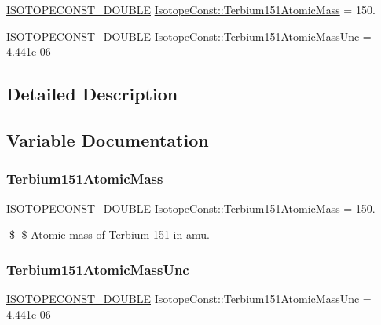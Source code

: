 \begin{DoxyCompactItemize}
\item 
\mbox{\hyperlink{group___isotope_const-_macros_ga8f45a7272ce02c0b4c65c44636ed719a}{I\+S\+O\+T\+O\+P\+E\+C\+O\+N\+S\+T\+\_\+\+D\+O\+U\+B\+LE}} \mbox{\hyperlink{group___isotope_const-_terbium-_tb151_gae9f93be507fb33b69cace714cf8c8451}{Isotope\+Const\+::\+Terbium151\+Atomic\+Mass}} = 150.
\item 
\mbox{\hyperlink{group___isotope_const-_macros_ga8f45a7272ce02c0b4c65c44636ed719a}{I\+S\+O\+T\+O\+P\+E\+C\+O\+N\+S\+T\+\_\+\+D\+O\+U\+B\+LE}} \mbox{\hyperlink{group___isotope_const-_terbium-_tb151_gaa0549a6f8029bafbaf1cb2115b29bf80}{Isotope\+Const\+::\+Terbium151\+Atomic\+Mass\+Unc}} = 4.\+441e-\/06
\end{DoxyCompactItemize}


\subsection{Detailed Description}


\subsection{Variable Documentation}
\mbox{\label{group___isotope_const-_terbium-_tb151_gae9f93be507fb33b69cace714cf8c8451}} 
\subsubsection{\texorpdfstring{Terbium151\+Atomic\+Mass}{Terbium151AtomicMass}}
{\footnotesize\ttfamily \mbox{\hyperlink{group___isotope_const-_macros_ga8f45a7272ce02c0b4c65c44636ed719a}{I\+S\+O\+T\+O\+P\+E\+C\+O\+N\+S\+T\+\_\+\+D\+O\+U\+B\+LE}} Isotope\+Const\+::\+Terbium151\+Atomic\+Mass = 150.}

\$ \$ Atomic mass of Terbium-\/151 in amu. \mbox{\label{group___isotope_const-_terbium-_tb151_gaa0549a6f8029bafbaf1cb2115b29bf80}} 
\subsubsection{\texorpdfstring{Terbium151\+Atomic\+Mass\+Unc}{Terbium151AtomicMassUnc}}
{\footnotesize\ttfamily \mbox{\hyperlink{group___isotope_const-_macros_ga8f45a7272ce02c0b4c65c44636ed719a}{I\+S\+O\+T\+O\+P\+E\+C\+O\+N\+S\+T\+\_\+\+D\+O\+U\+B\+LE}} Isotope\+Const\+::\+Terbium151\+Atomic\+Mass\+Unc = 4.\+441e-\/06}

